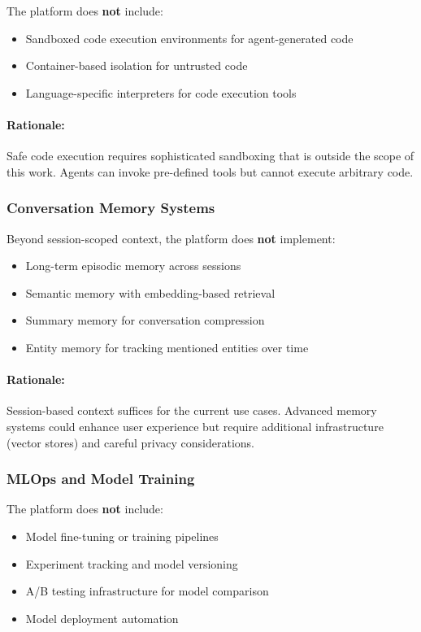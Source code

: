 The platform does \textbf{not} include:

\begin{itemize}
    \item Sandboxed code execution environments for agent-generated code
    \item Container-based isolation for untrusted code
    \item Language-specific interpreters for code execution tools
\end{itemize}

\paragraph{Rationale:} Safe code execution requires sophisticated sandboxing that is outside the scope of this work. Agents can invoke pre-defined tools but cannot execute arbitrary code.

\subsubsection{Conversation Memory Systems}

Beyond session-scoped context, the platform does \textbf{not} implement:

\begin{itemize}
    \item Long-term episodic memory across sessions
    \item Semantic memory with embedding-based retrieval
    \item Summary memory for conversation compression
    \item Entity memory for tracking mentioned entities over time
\end{itemize}

\paragraph{Rationale:} Session-based context suffices for the current use cases. Advanced memory systems could enhance user experience but require additional infrastructure (vector stores) and careful privacy considerations.

\subsubsection{MLOps and Model Training}

The platform does \textbf{not} include:

\begin{itemize}
    \item Model fine-tuning or training pipelines
    \item Experiment tracking and model versioning
    \item A/B testing infrastructure for model comparison
    \item Model deployment automation
\end{itemize}

